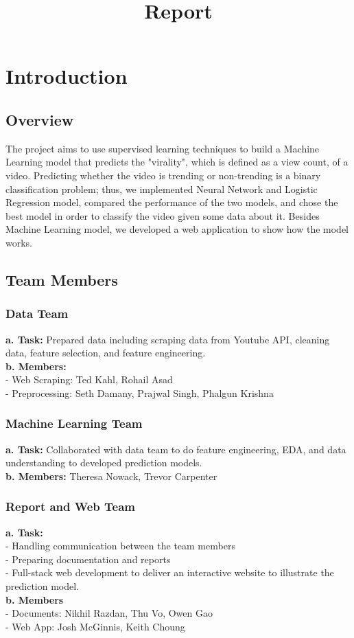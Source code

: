 \documentclass{article}
\title{Report}
\begin{document}
\maketitle

\section{Introduction}
\subsection{Overview}
The project aims to use supervised learning techniques to build a Machine Learning model that predicts the "virality", which is defined as a view count, of a video. Predicting whether the video is trending or non-trending is a binary classification problem; thus, we implemented Neural Network and Logistic Regression model, compared the performance of the two models, and chose the best model in order to classify the video given some data about it. Besides Machine Learning model, we developed a web application to show how the model works. 
\subsection{Team Members}
\subsubsection{Data Team}
\textbf{a. Task: }
Prepared data including scraping data from Youtube API, cleaning data, feature selection, and feature engineering.\\
\textbf{b. Members:}\\
- Web Scraping: Ted Kahl, Rohail Asad\\
- Preprocessing: Seth Damany, Prajwal Singh, Phalgun Krishna
\subsubsection{Machine Learning Team}
\textbf{a. Task: }
Collaborated with data team to do feature engineering, EDA, and data understanding to developed prediction models.\\
\textbf{b. Members:} Theresa Nowack, Trevor Carpenter\\
\subsubsection{Report and Web Team}
\textbf{a. Task: }\\
- Handling communication between the team members\\
- Preparing documentation and reports\\
- Full-stack web development to deliver an interactive website to illustrate the prediction model.\\
\textbf{b. Members}\\
- Documents: Nikhil Razdan, Thu Vo, Owen Gao\\
- Web App: Josh McGinnis, Keith Choung
\end{document}
